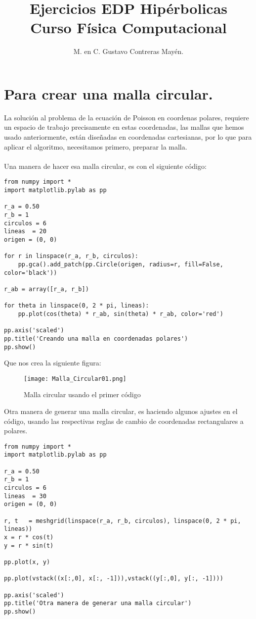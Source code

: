 \documentclass[12pt]{article}
\author{M. en C. Gustavo Contreras Mayén.}
\title{Ejercicios EDP Hipérbolicas \\ Curso Física Computacional}
\date{ }
\begin{document}
\maketitle
\fontsize{14}{14}\selectfont
\section*{Para crear una malla circular.}
La solución al problema de la ecuación de Poisson en coordenas polares, requiere un espacio de trabajo precisamente en estas coordenadas, las mallas que hemos usado anteriormente, están diseñadas en coordenadas cartesianas, por lo que para aplicar el algoritmo, necesitamos primero, preparar la malla.
\\
\\
Una manera de hacer esa malla circular, es con el siguiente código:
\begin{lstlisting}
from numpy import *
import matplotlib.pylab as pp

r_a = 0.50
r_b = 1
circulos = 6  
lineas  = 20
origen = (0, 0)

for r in linspace(r_a, r_b, circulos):
    pp.gca().add_patch(pp.Circle(origen, radius=r, fill=False, color='black'))

r_ab = array([r_a, r_b])

for theta in linspace(0, 2 * pi, lineas):
    pp.plot(cos(theta) * r_ab, sin(theta) * r_ab, color='red')

pp.axis('scaled')
pp.title('Creando una malla en coordenadas polares')
pp.show()
\end{lstlisting}
Que nos crea la siguiente figura:
\begin{figure}[H]
\begin{center}
\texttt{[image: Malla\_Circular01.png]} 
\caption{Malla circular usando el primer código}
\end{center}
\end{figure}
Otra manera de generar una malla circular, es haciendo algunos ajustes en el código, usando las respectivas reglas de cambio de coordenadas rectangulares a polares.
\begin{lstlisting}
from numpy import *
import matplotlib.pylab as pp

r_a = 0.50
r_b = 1
circulos = 6  
lineas  = 30
origen = (0, 0)

r, t   = meshgrid(linspace(r_a, r_b, circulos), linspace(0, 2 * pi, lineas))
x = r * cos(t)
y = r * sin(t)

pp.plot(x, y)

pp.plot(vstack((x[:,0], x[:, -1])),vstack((y[:,0], y[:, -1])))
           
pp.axis('scaled')
pp.title('Otra manera de generar una malla circular')
pp.show()
\end{lstlisting}
\end{document}
